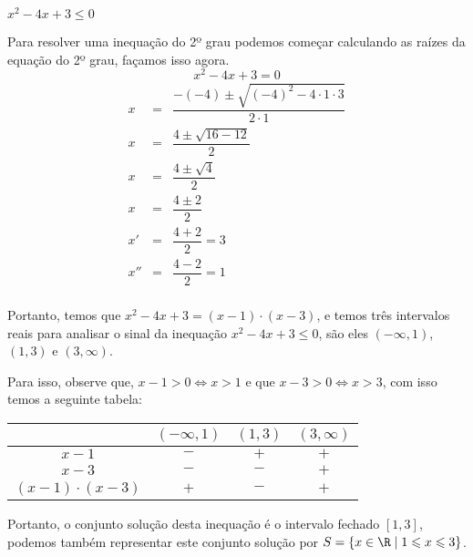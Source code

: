  \begin{exem}
 $x^2-4x+3 \leqslant 0$
 
 Para resolver uma inequação do 2º grau podemos começar calculando as raízes da equação do 2º grau, façamos isso agora.
\begin{equation}
x^2-4x+3 = 0
\end{equation}
 \begin{eqnarray*}
 x &=& \dfrac{-(-4) \pm \sqrt{(-4)^2 - 4 \cdot 1 \cdot 3}}{2 \cdot 1} \\
 x &=& \dfrac{4 \pm \sqrt{16 - 12}}{2} \\
 x &=& \dfrac{4 \pm \sqrt{4}}{2} \\
 x &=& \dfrac{4 \pm 2}{2} \\
 x' &=& \dfrac{4 + 2}{2} = 3 \ \\
 x'' &=& \dfrac{4 - 2}{2} = 1 \\
 \end{eqnarray*}
 
 Portanto, temos que $x^2-4x+3= (x-1) \cdot (x-3)$, e temos três intervalos reais para analisar o sinal da inequação $x^2-4x+3 \leqslant 0$, são eles $(-\infty, 1)$, $(1, 3)$ e $(3, \infty)$. 
 
 Para isso, observe que, $x-1> 0 \Leftrightarrow x> 1$ e que $x-3> 0 \Leftrightarrow x> 3$, com isso temos a seguinte tabela:
 
 \begin{table}[H]
 \centering
 \begin{tabular}{|c|c|c|c|} \hline
 \rowcolor{cinza}
         & $(-\infty, 1)$ & $(1, 3)$ & $(3, \infty)$ \\ \hline
 $x - 1$ & $-$ & $+$ & $+$ \\ \hline
 $x - 3$ & $-$ & $-$ & $+$ \\ \hline
 $(x-1) \cdot (x-3)$ & $+$ & $-$ & $+$ \\ \hline
 \end{tabular}
 \end{table}
 
 Portanto, o conjunto solução desta inequação é o intervalo fechado $[1, 3]$, podemos também representar este conjunto solução por $S= \left\{ x \in \R \mid 1 \leqslant x \leqslant 3 \right\}$.
 \end{exem}
 
